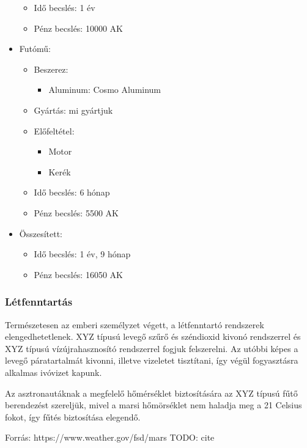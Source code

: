 \documentclass[12pt]{report}
\begin{document}
\begin{itemize}
\begin{itemize}
            \item Idő becslés: 1 év
            \item Pénz becslés: 10000 AK
        \end{itemize}
    \item Futómű:
        \begin{itemize}
            \item Beszerez:
                \begin{itemize}
                    \item Aluminum: Cosmo Aluminum
                \end{itemize}
            \item Gyártás: mi gyártjuk
            \item Előfeltétel: 
                \begin{itemize}
                    \item Motor
                    \item Kerék
                \end{itemize}
            \item Idő becslés: 6 hónap
            \item Pénz becslés: 5500 AK
        \end{itemize}
    \item Összesített:
        \begin{itemize}
            \item Idő becslés: 1 év, 9 hónap
            \item Pénz becslés: 16050 AK
        \end{itemize}
\end{itemize}

\subsubsection{Létfenntartás}

Természetesen az emberi személyzet végett, a létfenntartó rendszerek elengedhetetlenek. XYZ típusú levegő szűrő és széndioxid kivonó rendszerrel és XYZ típusú vízújrahasznosító rendszerrel fogjuk felszerelni. Az utóbbi képes a levegő páratartalmát kivonni, illetve vizeletet tisztítani, így végül fogyasztásra alkalmas ivóvizet kapunk.

Az asztronautáknak a megfelelő hőmérséklet biztosítására az XYZ típusú fűtő berendezést szereljük, mivel a marsi hőmörséklet nem haladja meg a 21 Celsius fokot, így fűtés biztosítása elegendő.

Forrás: https://www.weather.gov/fsd/mars
TODO: cite
\end{document}

